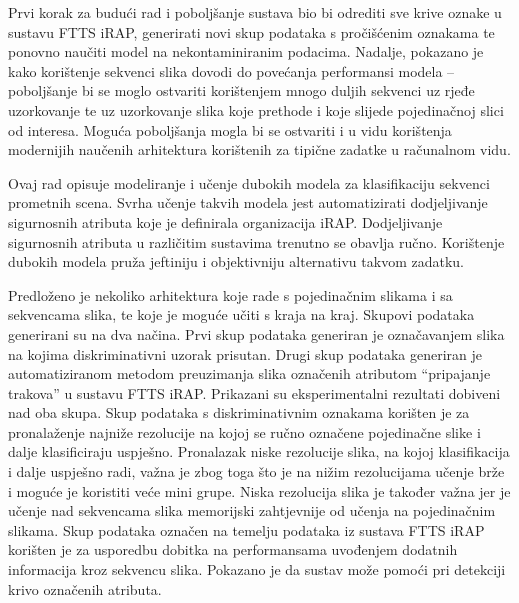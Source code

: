\documentclass[times, utf8, diplomski, numeric]{fer}
\begin{document}
Prvi korak za budući rad i poboljšanje sustava bio bi odrediti sve krive oznake u sustavu FTTS iRAP, generirati novi skup podataka s pročišćenim oznakama te ponovno naučiti model na nekontaminiranim podacima.
Nadalje, pokazano je kako korištenje sekvenci slika dovodi do povećanja performansi modela -- poboljšanje bi se moglo ostvariti korištenjem mnogo duljih sekvenci uz rjeđe uzorkovanje te uz uzorkovanje slika koje prethode i koje slijede pojedinačnoj slici od interesa. 
Moguća poboljšanja mogla bi se ostvariti i u vidu korištenja modernijih naučenih arhitektura korištenih za tipične zadatke u računalnom vidu.




\begin{sazetak}
Ovaj rad opisuje modeliranje i učenje dubokih modela za klasifikaciju sekvenci prometnih scena.
Svrha učenje takvih modela jest automatizirati dodjeljivanje sigurnosnih atributa koje je definirala organizacija iRAP.
Dodjeljivanje sigurnosnih atributa u različitim sustavima trenutno se obavlja ručno.
Korištenje dubokih modela pruža jeftiniju i objektivniju alternativu takvom zadatku.

Predloženo je nekoliko arhitektura koje rade s pojedinačnim slikama i sa sekvencama slika, te koje je moguće učiti s kraja na kraj.
Skupovi podataka generirani su na dva načina. Prvi skup podataka generiran je označavanjem slika na kojima diskriminativni uzorak prisutan.
Drugi skup podataka generiran je automatiziranom metodom preuzimanja slika označenih atributom ``pripajanje trakova'' u sustavu FTTS iRAP.
Prikazani su eksperimentalni rezultati dobiveni nad oba skupa.
Skup podataka s diskriminativnim oznakama korišten je za pronalaženje najniže rezolucije na kojoj se ručno označene pojedinačne slike i dalje klasificiraju uspješno. 
Pronalazak niske rezolucije slika, na kojoj klasifikacija i dalje uspješno radi, važna je zbog toga što je na nižim rezolucijama učenje brže i moguće je koristiti veće mini grupe.
Niska rezolucija slika je također važna jer je učenje nad sekvencama slika memorijski zahtjevnije od učenja na pojedinačnim slikama.
Skup podataka označen na temelju podataka iz sustava FTTS iRAP korišten je za usporedbu dobitka na performansama uvođenjem dodatnih informacija kroz sekvencu slika.
Pokazano je da sustav može pomoći pri detekciji krivo označenih atributa.


 \\
\end{sazetak}
\end{document}
